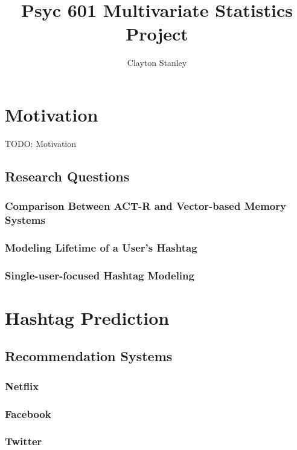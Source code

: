 \documentclass[man]{apa6}
\title{Psyc 601 Multivariate Statistics Project}
\author{Clayton Stanley}
\affiliation{Rice University}
\begin{document}
\maketitle

\tableofcontents
\newpage

\section{Motivation}

TODO: Motivation

\subsection{Research Questions}

\subsubsection{Comparison Between ACT-R and Vector-based Memory Systems}

\subsubsection{Modeling Lifetime of a User's Hashtag}

\subsubsection{Single-user-focused Hashtag Modeling}

\section{Hashtag Prediction}

\subsection{Recommendation Systems}

\subsubsection{Netflix}

\subsubsection{Facebook}

\subsubsection{Twitter}
\end{document}
